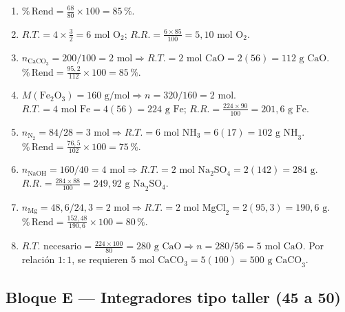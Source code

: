 \documentclass[12pt, letterpaper]{article}
\newcommand{\pc}{\text{\%}}
\begin{document}
\begin{enumerate}[leftmargin=*, label=\textbf{\arabic*.}, start=37]
  \item $\pc\,\text{Rend} = \frac{68}{80}\times 100 = 85\,\pc$.
  \item $R.T. = 4\times\frac{3}{2} = 6\text{ mol O}_2$; \quad $R.R. = \frac{6\times 85}{100} = 5{,}10\text{ mol O}_2$.
  \item $n_{\text{CaCO}_3} = 200/100 = 2\text{ mol} \Rightarrow R.T. = 2\text{ mol CaO} = 2(56) = 112\text{ g CaO}$. $\pc\,\text{Rend} = \frac{95{,}2}{112}\times 100 = 85\,\pc$.
  \item $M(\text{Fe}_2\text{O}_3) = 160\text{ g/mol} \Rightarrow n = 320/160 = 2\text{ mol}$. $R.T. = 4\text{ mol Fe} = 4(56) = 224\text{ g Fe}$; \quad $R.R. = \frac{224\times 90}{100} = 201{,}6\text{ g Fe}$.
  \item $n_{\text{N}_2} = 84/28 = 3\text{ mol} \Rightarrow R.T. = 6\text{ mol NH}_3 = 6(17) = 102\text{ g NH}_3$. $\pc\,\text{Rend} = \frac{76{,}5}{102}\times 100 = 75\,\pc$.
  \item $n_{\text{NaOH}} = 160/40 = 4\text{ mol} \Rightarrow R.T. = 2\text{ mol Na}_2\text{SO}_4 = 2(142) = 284\text{ g}$. $R.R. = \frac{284\times 88}{100} = 249{,}92\text{ g Na}_2\text{SO}_4$.
  \item $n_{\text{Mg}} = 48{,}6/24{,}3 = 2\text{ mol} \Rightarrow R.T. = 2\text{ mol MgCl}_2 = 2(95{,}3) = 190{,}6\text{ g}$. $\pc\,\text{Rend} = \frac{152{,}48}{190{,}6}\times 100 = 80\,\pc$.
  \item $R.T.\text{ necesario} = \frac{224\times 100}{80} = 280\text{ g CaO} \Rightarrow n = 280/56 = 5\text{ mol CaO}$. Por relación $1:1$, se requieren $5\text{ mol CaCO}_3 = 5(100) = 500\text{ g CaCO}_3$.
\end{enumerate}

\subsection*{Bloque E — Integradores tipo taller (45 a 50)}
\end{document}
